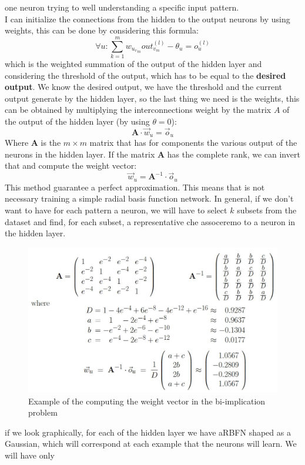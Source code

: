 \documentclass{article}
\begin{document}
one neuron trying to well understanding a specific input pattern.
\linebreak\\\noindent I can initialize the connections from the hidden to the output
neurons by using weights, this can be done by considering this formula:
$$\forall u:\sum_{k=1}^{m}w_{{u_v}_m} out_{v_m}^{(l)}-\theta_u=o_u^{(l)}$$
which is the weighted summation of the output of the hidden layer and considering the threshold
of the output, which has to be equal to the \textbf{desired output}. We know the desired output,
we have the threshold and the current output generate by the hidden layer, so the last thing we
need is the weights, this can be obtained by multiplying the interconnections weight by the
matrix $A$ of the output of the hidden layer (by using $\theta=0$):
$$\textbf{A}\cdot\vec{w}_u=\vec{o}_u$$
Where $\textbf{A}$ is the $m\times m$ matrix that has for components the various output of the
neurons in the hidden layer. If the matrix $\textbf{A}$ has the complete rank, we can invert that and
compute the weight vector:
$$\vec{w}_u=\textbf{A}^{-1}\cdot\vec{o}_u$$
This method guarantee a perfect approximation. This means that is not necessary training
a simple radial basis function network. In general, if we don't want to have for each pattern a neuron,
we will have to select $k$ subsets from the dataset and find, for each subset, a representative che assoceremo
to a neuron in the hidden layer.
\begin{figure}
    \centering
    \includegraphics[scale=0.4]{images/example_biimp_rbfn.png}
    \caption{Example of the computing the weight vector in the bi-implication problem}
\end{figure}
if we look graphically, for each of the hidden layer we have aRBFN shaped as a Gaussian,
which will correspond at each example that the neurons will learn. We will have only
\end{document}
